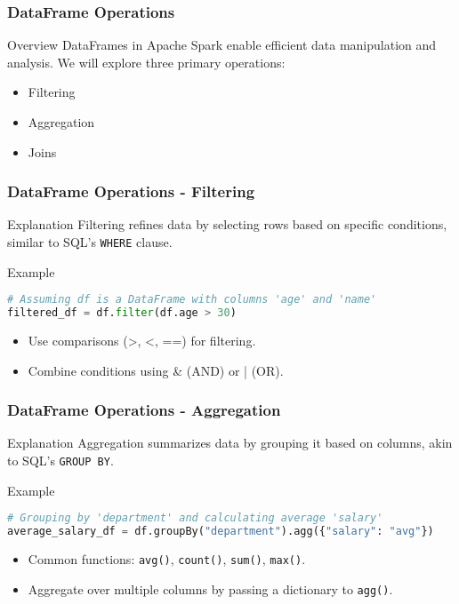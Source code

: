 \documentclass[aspectratio=169]{beamer}
\begin{document}
\begin{frame}
    \frametitle{DataFrame Operations}
    \begin{block}{Overview}
        DataFrames in Apache Spark enable efficient data manipulation and analysis. We will explore three primary operations:
        \begin{itemize}
            \item Filtering
            \item Aggregation
            \item Joins
        \end{itemize}
    \end{block}
\end{frame}

\begin{frame}[fragile]
    \frametitle{DataFrame Operations - Filtering}
    \begin{block}{Explanation}
        Filtering refines data by selecting rows based on specific conditions, similar to SQL's \texttt{WHERE} clause.
    \end{block}
    
    \begin{block}{Example}
        \begin{lstlisting}[language=Python]
# Assuming df is a DataFrame with columns 'age' and 'name'
filtered_df = df.filter(df.age > 30)
        \end{lstlisting}
    \end{block}
    
    \begin{itemize}
        \item Use comparisons (>, <, ==) for filtering.
        \item Combine conditions using \& (AND) or | (OR).
    \end{itemize}
\end{frame}

\begin{frame}[fragile]
    \frametitle{DataFrame Operations - Aggregation}
    \begin{block}{Explanation}
        Aggregation summarizes data by grouping it based on columns, akin to SQL's \texttt{GROUP BY}.
    \end{block}
    
    \begin{block}{Example}
        \begin{lstlisting}[language=Python]
# Grouping by 'department' and calculating average 'salary'
average_salary_df = df.groupBy("department").agg({"salary": "avg"})
        \end{lstlisting}
    \end{block}
    
    \begin{itemize}
        \item Common functions: \texttt{avg()}, \texttt{count()}, \texttt{sum()}, \texttt{max()}.
        \item Aggregate over multiple columns by passing a dictionary to \texttt{agg()}.
    \end{itemize}
\end{frame}
\end{document}
